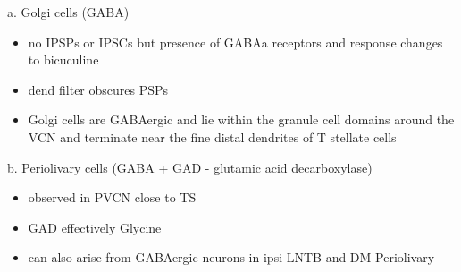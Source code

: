 


a. Golgi cells (GABA)

\begin{itemize}
\item no IPSPs or IPSCs but presence of GABAa receptors and response changes to bicuculine \citep{WuOertel:1986,OertelWickesberg:1993,FerragamoGoldingEtAl:1998a}
\item dend filter obscures PSPs
\item Golgi cells are GABAergic and lie within the granule cell domains around the VCN and terminate near the fine distal dendrites of T stellate cells
\end{itemize}

b. Periolivary cells (GABA + GAD - glutamic acid decarboxylase) 

\begin{itemize}
\item observed in PVCN close to TS \citep{AdamsMugnaini:1987}
\item GAD effectively Glycine \citep{GoldingOertel:1997}
\item can also arise from GABAergic neurons in ipsi LNTB and DM Periolivary
\end{itemize}

